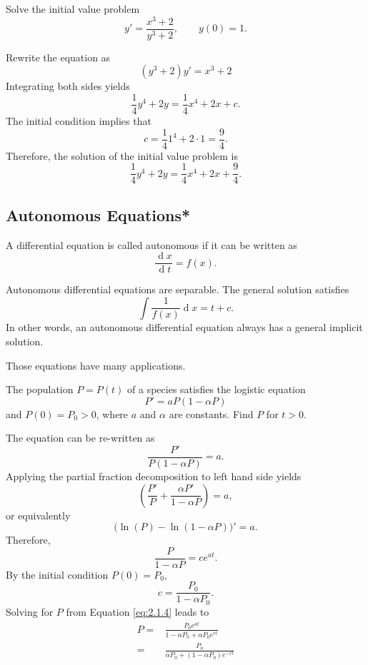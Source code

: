 \begin{exercise}
 Solve the initial value problem
\[y' = \frac{x^3+2}{y^3+ 2},\qquad y(0)   =  1.\]
\end{exercise}
\begin{exersol}
Rewrite the equation as
\[(y^3+2)y' = x^3+2 \]
Integrating both sides yields
\[\frac{1}{4}y^4 + 2y  =  \frac{1}{4}x^4+2x + c. \]
The initial condition implies that
\[ c=\frac{1}{4} 1^4 + 2\cdot 1  =  \frac94. \]
Therefore, the solution of the initial value problem is 
\[\frac{1}{4}y^4 + 2y  =  \frac{1}{4}x^4+2x + \frac{9}{4}. \]
\end{exersol}

\subsection{Autonomous Equations*}
\begin{definition}
  A differential equation is called autonomous if it can be written as
  \[\frac{\operatorname{d} x}{\operatorname{d} t}=f(x).\]
\end{definition}

Autonomous differential equations are separable. The general solution satisfies 
\[\int \frac{1}{f(x)}\operatorname{d} x = t + c.\]
In other words, an autonomous differential equation always has a general implicit solution.

Those equations have many applications.

\begin{example}
  The population $P=P(t)$ of a species satisfies the logistic equation \[P'=aP(1-\alpha P)\] and $P(0)=P_0>0$, where $a$ and $\alpha$ are constants. Find $P$ for $t>0$.
\end{example}
\begin{solution}
  The equation can be re-written as
  \[\frac{P'}{P(1-\alpha P)}=a.\]
  Applying the partial fraction decomposition to left hand side yields
  \[\left(\frac{P'}{P}+\frac{\alpha P'}{1-\alpha P}\right)=a,\]
  or equivalently
  \[\Big(\ln(P)-\ln(1-\alpha P)\Big)'=a.\]
  Therefore,
  \begin{equation}
    \frac{P}{1-\alpha P}=ce^{a t}.
    \label{eq:2.1.4}
    \end{equation}
  By the initial condition $P(0)=P_0$,
  \[c=\frac{P_0}{1-\alpha P_0}.\]
  Solving for $P$ from Equation \ref{eq:2.1.4} leads to
  \[\begin{aligned}
  P=&\frac{P_0 e^{at}}{1-\alpha P_0 + \alpha P_0 e^{rt}}\\
    =&\frac{P_0 }{\alpha P_0 + (1-\alpha P_0)e^{-rt}}
  \end{aligned}
  \]
\end{solution}

